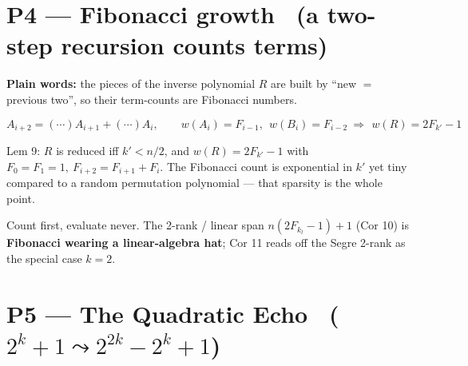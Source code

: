 \documentclass[11pt]{article}
\begin{document}
\section{P4 --- Fibonacci growth \ (a two-step recursion counts terms)}

\textbf{Plain words:} the pieces of the inverse polynomial $R$ are built by
``new $=$ previous two'', so their term-counts are Fibonacci numbers.

\[
  A_{i+2} = (\cdots)A_{i+1} + (\cdots)A_i,
  \qquad
  w(A_i)=F_{i-1},\ \ w(B_i)=F_{i-2}
  \ \Longrightarrow\
  \boxed{\,w(R)=2F_{k'}-1\,}
\]

\begin{center}
\qquad
{}
\end{center}

\begin{remarkbox}
Lem 9: $R$ is reduced iff $k'<n/2$, and $w(R)=2F_{k'}-1$ with
$F_0=F_1=1,\ F_{i+2}=F_{i+1}+F_i$. The Fibonacci count is exponential in $k'$
yet tiny compared to a random permutation polynomial --- that sparsity is the
whole point.
\end{remarkbox}

\begin{coolfact}
Count first, evaluate never. The 2-rank / linear span
$n(2F_{k_l}-1)+1$ (Cor 10) is \textbf{Fibonacci wearing a linear-algebra hat};
Cor 11 reads off the Segre 2-rank as the special case $k=2$.
\end{coolfact}

\section{P5 --- The Quadratic Echo \ ($2^k{+}1 \leadsto 2^{2k}{-}2^k{+}1$)}
\end{document}
